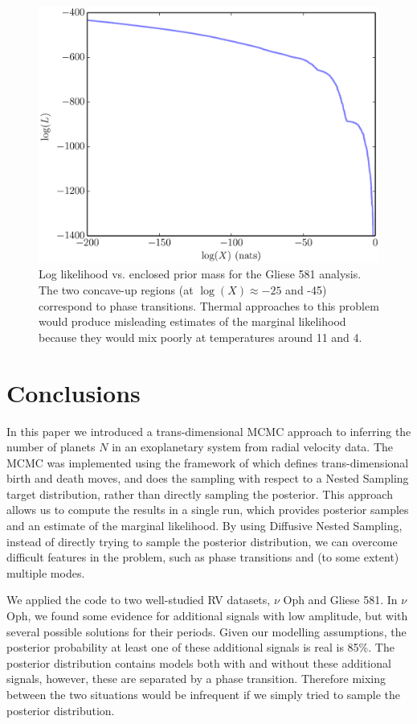 \documentclass[useAMS,usenatbib]{mn2e}
\begin{document}
\begin{figure}
\includegraphics[scale=0.45]{Figures/logl.eps}
\caption{Log likelihood vs. enclosed prior mass for the Gliese 581 analysis.
The two concave-up regions (at $\log(X) \approx -25$ and -45) correspond to
phase transitions. Thermal approaches to this problem would produce misleading
estimates of the marginal likelihood because they would mix poorly at temperatures
around 11 and 4.
\label{fig:logl}}
\end{figure}


\section{Conclusions}
In this paper we introduced a trans-dimensional MCMC approach to inferring
the number of planets $N$ in an exoplanetary system from radial velocity data.
The MCMC was implemented using the framework of \citet{rjobject} which
defines trans-dimensional birth and death moves, and does the sampling
with respect to a Nested Sampling target distribution, rather than directly
sampling the posterior. This approach allows us to compute the results in a
single run, which provides posterior samples and an estimate of the marginal
likelihood. By using Diffusive Nested Sampling, instead of
directly trying to sample the posterior distribution, we can overcome difficult
features in the problem, such as phase transitions and (to some extent)
multiple modes.

We applied the code to two well-studied RV datasets, $\nu$ Oph and Gliese 581.
In $\nu$ Oph, we found some evidence for additional signals with low amplitude,
but with several possible solutions for their periods. Given our modelling
assumptions, the posterior probability at least one of these additional signals
is real is 85\%. The posterior distribution contains models both with and without
these additional signals, however, these are separated by a phase transition.
Therefore mixing between the two situations would be infrequent if we simply
tried to sample the posterior distribution.
\end{document}
